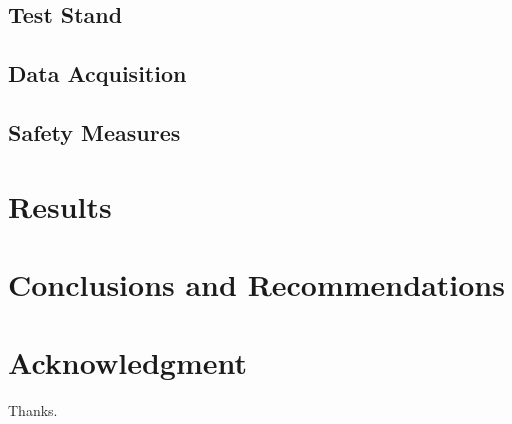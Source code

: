 \documentclass[journal]{IEEEtran}
\begin{document}
\subsection{Test Stand}

\subsection{Data Acquisition}

\subsection{Safety Measures}

\section{Results}

\section{Conclusions and Recommendations}

\section*{Acknowledgment}
Thanks.



\end{document}
